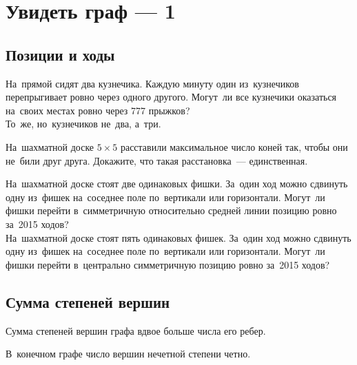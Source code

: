 
\section*{Увидеть граф --- 1}



\subsection*{Позиции и ходы}

\begin{problems}

\item
\sp
На~прямой сидят два кузнечика.
Каждую минуту один из~кузнечиков перепрыгивает ровно через одного другого.
Могут~ли все кузнечики оказаться на~своих местах ровно через 777 прыжков?
\\
\sp
То~же, но~кузнечиков не~два, а~три.

\item
На~шахматной доске $5 \times 5$ расставили максимальное число коней так, чтобы
они не~били друг друга.
Докажите, что такая расстановка~--- единственная.

\item
\sp
На~шахматной доске стоят две одинаковых фишки.
За~один ход можно сдвинуть одну из~фишек на~соседнее поле по~вертикали или
горизонтали.
Могут~ли фишки перейти в~симметричную относительно средней линии позицию ровно
за~2015 ходов?
\\
\sp
На~шахматной доске стоят пять одинаковых фишек.
За~один ход можно сдвинуть одну из~фишек на~соседнее поле по~вертикали или
горизонтали.
Могут~ли фишки перейти в~центрально симметричную позицию ровно за~2015 ходов?

\end{problems}

\subsection*{Сумма степеней вершин}

Сумма степеней вершин графа вдвое больше числа его ребер.

В~конечном графе число вершин нечетной степени четно. 

